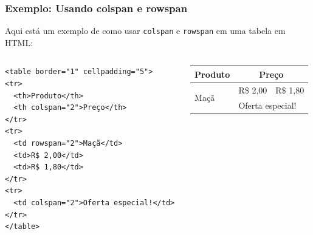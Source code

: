 \documentclass{beamer}
\begin{document}
\begin{frame}[fragile]
  \frametitle{Exemplo: Usando colspan e rowspan}

  Aqui está um exemplo de como usar \texttt{colspan} e \texttt{rowspan} em uma tabela em HTML:

\begin{columns}
    \begin{column}{0.5\textwidth}
  \begin{verbatim}
<table border="1" cellpadding="5">
<tr>
  <th>Produto</th>
  <th colspan="2">Preço</th>
</tr>
<tr>
  <td rowspan="2">Maçã</td>
  <td>R$ 2,00</td>
  <td>R$ 1,80</td>
</tr>
<tr>
  <td colspan="2">Oferta especial!</td>
</tr>
</table>
  \end{verbatim}        
    \end{column}
    \begin{column}{0.5\textwidth}
\begin{table}[]
\begin{tabular}{|l|ll|}
\hline
\multicolumn{1}{|c|}{\textbf{Produto}} & \multicolumn{2}{c|}{\textbf{Preço}}      \\ \hline
\multirow{2}{*}{Maçã}                  & \multicolumn{1}{l|}{R\$ 2,00} & R\$ 1,80 \\ \cline{2-3} 
                                       & \multicolumn{2}{l|}{Oferta especial!}    \\ \hline
\end{tabular}
\end{table}
    \end{column}
\end{columns}



\end{frame}
\end{document}
